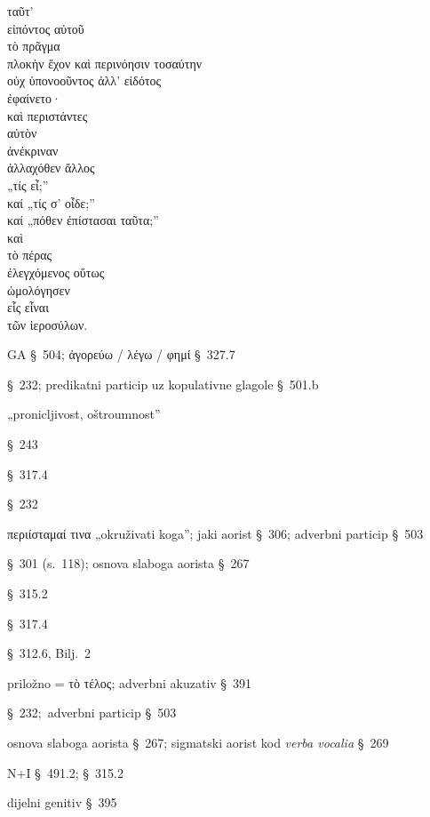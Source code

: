 
{\large
\begin{greek}
\noindent ταῦτ' \\
\tabto{2em} εἰπόντος αὐτοῦ \\
τὸ πρᾶγμα \\
\tabto{2em} πλοκὴν ἔχον καὶ περινόησιν τοσαύτην \\
οὐχ ὑπονοοῦντος ἀλλ' εἰδότος \\
\tabto{2em} ἐφαίνετο· \\
καὶ περιστάντες \\
\tabto{2em} αὐτὸν \\
ἀνέκριναν \\
\tabto{2em} ἀλλαχόθεν ἄλλος \\
„τίς εἶ;” \\
καί „τίς σ' οἶδε;” \\
καί „πόθεν ἐπίστασαι ταῦτα;” \\
καὶ \\
\tabto{2em} τὸ πέρας \\
\tabto{2em} ἐλεγχόμενος οὕτως \\
ὡμολόγησεν \\
\tabto{2em} εἷς εἶναι \\
\tabto{4em} τῶν ἱεροσύλων. \\

\end{greek}
}

\begin{description}[noitemsep]
\item[εἰπόντος αὐτοῦ] GA §~504; ἀγορεύω / λέγω / φημί §~327.7
\item[ἔχον] §~232; predikatni particip uz kopulativne glagole §~501.b
\item[περινόησιν] „pronicljivost, oštroumnost”
\item[ὑπονοοῦντος] §~243
\item[εἰδότος] §~317.4
\item[ἐφαίνετο] §~232
\item[περιστάντες] περιίσταμαί τινα „okruživati koga”; jaki aorist §~306; adverbni particip §~503
\item[ἀνέκριναν] §~301 (s.~118); osnova slaboga aorista §~267  
\item[εἶ] §~315.2
\item[οἶδε] §~317.4
\item[ἐπίστασαι] §~312.6, Bilj.~2
\item[τὸ πέρας] priložno = τὸ τέλος; adverbni akuzativ §~391
\item[ἐλεγχόμενος] §~232; adverbni particip §~503
\item[ὡμολόγησεν] osnova slaboga aorista §~267; sigmatski aorist kod \textit{verba vocalia} §~269
\item[εἷς εἶναι] N+I §~491.2; §~315.2
\item[τῶν ἱεροσύλων] dijelni genitiv §~395

\end{description}


